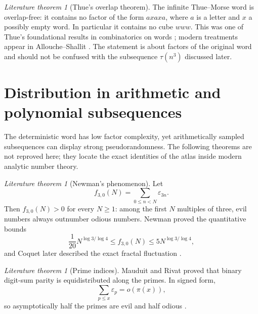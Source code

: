 \documentclass[11pt,oneside]{article}
\numberwithin{equation}{section}
\theoremstyle{definition}
\theoremstyle{remark}
\newtheorem{literature}[theorem]{Literature theorem}
\newcommand{\eps}{\varepsilon}
\newcommand{\TM}{\tau}
\newcommand{\smallo}{o}
\begin{document}
\begin{literature}[Thue's overlap theorem]
The infinite Thue--Morse word is overlap-free: it contains no factor of the
form \(axaxa\), where \(a\) is a letter and \(x\) a possibly empty word.  In
particular it contains no cube \(www\).  This was one of Thue's foundational
results in combinatorics on words \cite{Thue1906}; modern treatments appear in
Allouche--Shallit \cite{AlloucheShallitBook}.  The statement is about factors
of the original word and should not be confused with the subsequence
\(\TM(n^3)\) discussed later.
\end{literature}

\section{Distribution in arithmetic and polynomial subsequences}
\label{sec:distribution}

The deterministic word has low factor complexity, yet arithmetically sampled
subsequences can display strong pseudorandomness.  The following theorems are
not reproved here; they locate the exact identities of the atlas inside modern
analytic number theory.

\begin{literature}[Newman's phenomenon]
Let
\begin{equation}
 f_{3,0}(N)=\sum_{0\le n<N}\eps_{3n}.
 \label{eq:Newman-sum}
\end{equation}
Then \(f_{3,0}(N)>0\) for every \(N\ge1\): among the first \(N\) multiples of
three, evil numbers always outnumber odious numbers.  Newman proved the
quantitative bounds
\begin{equation}
 \frac1{20}N^{\log3/\log4}
 \le f_{3,0}(N)\le5N^{\log3/\log4},
 \label{eq:Newman-bounds}
\end{equation}
and Coquet later described the exact fractal fluctuation
\cite{Newman,Coquet,ShallitRarefied}.
\end{literature}

\begin{literature}[Prime indices]
Mauduit and Rivat proved that binary digit-sum parity is equidistributed along
the primes.  In signed form,
\begin{equation}
 \sum_{p\le x}\eps_p=\smallo(\pi(x)),
 \label{eq:primes-balance}
\end{equation}
so asymptotically half the primes are evil and half odious
\cite{MauduitRivatPrimes}.
\end{literature}
\end{document}
